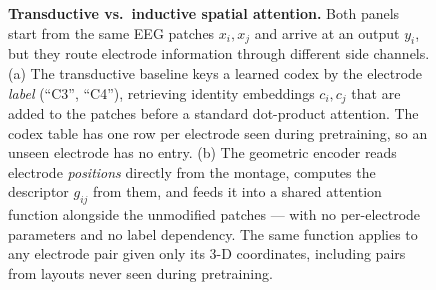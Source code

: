 \begin{figure}[h]
  \caption{\textbf{Transductive vs.\ inductive spatial attention.}
  Both panels start from the same EEG patches $x_i, x_j$ and arrive at an
  output $y_i$, but they route electrode information through different
  side channels. (a) The transductive baseline keys a learned codex by
  the electrode \emph{label} (``C3'', ``C4''), retrieving identity
  embeddings $c_i, c_j$ that are added to the patches before a standard
  dot-product attention. The codex table has one row per electrode seen
  during pretraining, so an unseen electrode has no entry. (b) The
  geometric encoder reads electrode \emph{positions} directly from the
  montage, computes the descriptor $g_{ij}$ from them, and feeds it into
  a shared attention function alongside the unmodified patches --- with
  no per-electrode parameters and no label dependency. The same function
  applies to any electrode pair given only its 3-D coordinates,
  including pairs from layouts never seen during pretraining.}
  \label{fig:inductive}
\end{figure}
